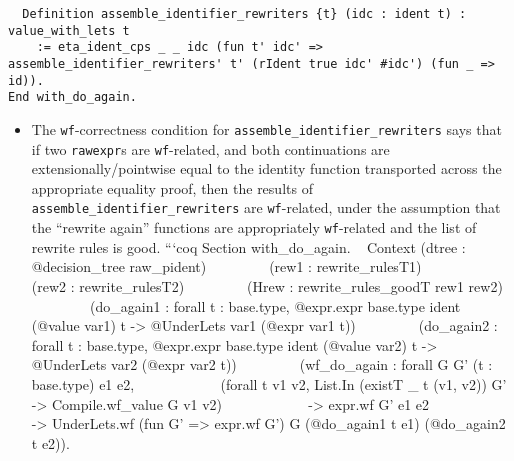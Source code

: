 \begin{itemize}
\begin{verbatim}
  Definition assemble_identifier_rewriters {t} (idc : ident t) : value_with_lets t
    := eta_ident_cps _ _ idc (fun t' idc' => assemble_identifier_rewriters' t' (rIdent true idc' #idc') (fun _ => id)).
End with_do_again.
\end{verbatim}

  \begin{itemize}
  \tightlist
  \item
    The \texttt{wf}-correctness condition for
    \texttt{assemble\_identifier\_rewriters\textquotesingle{}} says that
    if two \texttt{rawexpr}s are \texttt{wf}-related, and both
    continuations are extensionally/pointwise equal to the identity
    function transported across the appropriate equality proof, then the
    results of
    \texttt{assemble\_identifier\_rewriters\textquotesingle{}} are
    \texttt{wf}-related, under the assumption that the ``rewrite again''
    functions are appropriately \texttt{wf}-related and the list of
    rewrite rules is good. ```coq Section with\_do\_again. ~ Context
    (dtree : @decision\_tree raw\_pident) ~ ~ ~ ~ ~ (rew1 :
    rewrite\_rulesT1) ~ ~ ~ ~ ~ (rew2 : rewrite\_rulesT2) ~ ~ ~ ~ ~
    (Hrew : rewrite\_rules\_goodT rew1 rew2) ~ ~ ~ ~ ~ (do\_again1 :
    forall t : base.type, @expr.expr base.type ident (@value var1) t
    -\textgreater{} @UnderLets var1 (@expr var1 t)) ~ ~ ~ ~ ~
    (do\_again2 : forall t : base.type, @expr.expr base.type ident
    (@value var2) t -\textgreater{} @UnderLets var2 (@expr var2 t)) ~ ~
    ~ ~ ~ (wf\_do\_again : forall G G' (t : base.type) e1 e2, ~ ~ ~ ~ ~
    ~ ~ (forall t v1 v2, List.In (existT \_ t (v1, v2)) G'
    -\textgreater{} Compile.wf\_value G v1 v2) ~ ~ ~ ~ ~ ~ ~
    -\textgreater{} expr.wf G' e1 e2 ~ ~ ~ ~ ~ ~ ~ -\textgreater{}
    UnderLets.wf (fun G' =\textgreater{} expr.wf G') G (@do\_again1 t
    e1) (@do\_again2 t e2)).
  \end{itemize}


\end{itemize}
